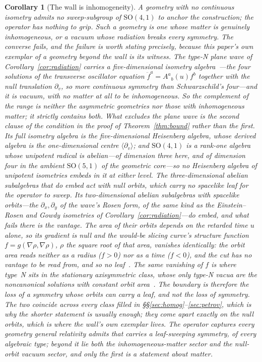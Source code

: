 \documentclass[11pt,a4paper]{article}
\newtheorem{corollary}[theorem]{Corollary}
\theoremstyle{definition}
\newcommand{\so}{\mathrm{SO}(4,1)}
\begin{document}
\begin{corollary}[The wall is inhomogeneity]\label{cor:wall}
A geometry with no continuous isometry admits no sweep-subgroup of $\so$ to anchor the construction; the operator has nothing to grip. Such a geometry is one whose matter is genuinely inhomogeneous, or a vacuum whose radiation breaks every symmetry. \emph{The converse fails, and the failure is worth stating precisely, because this paper's own exemplar of a geometry beyond the wall is its witness.} The type-N plane wave of Corollary~\ref{cor:radiation} carries a \emph{five}-dimensional isometry algebra~\cite{BondiPiraniRobinson1959}---the four solutions of the transverse oscillator equation $\ddot f^{a}=A^{a}{}_{b}(u)f^{b}$ together with the null translation $\partial_v$, so more continuous symmetry than Schwarzschild's four---and it is vacuum, with no matter at all to be inhomogeneous. So the complement of the range is neither the asymmetric geometries nor those with inhomogeneous matter; it strictly contains both. What excludes the plane wave is the \emph{second} clause of the condition in the proof of Theorem~\ref{thm:bound} rather than the first. Its full isometry algebra is the five-dimensional Heisenberg algebra, whose derived algebra is the one-dimensional centre $\langle\partial_v\rangle$; and $\so$ is a rank-one algebra whose unipotent radical is \emph{abelian}---of dimension three here, and of dimension four in the ambient $\mathrm{SO}(5,1)$ of the geometric core---so no Heisenberg algebra of unipotent isometries embeds in it at either level. The three-dimensional abelian subalgebras that do embed act with \emph{null} orbits, which carry no spacelike leaf for the operator to sweep. Its two-dimensional abelian subalgebras with spacelike orbits---the $\partial_{x},\partial_{y}$ of the wave's Rosen form, of the same kind as the Einstein--Rosen and Gowdy isometries of Corollary~\ref{cor:radiation}---do embed, and what fails there is the vantage. The area of their orbits depends on the retarded time $u$ alone, so its gradient is null and the would-be slicing curve's structure function $f=g(\nabla\rho,\nabla\rho)$, $\rho$ the square root of that area, vanishes identically: the orbit area reads neither as a radius ($f>0$) nor as a time ($f<0$), and the cut has no vantage to be read from, and so no leaf~\cite{JanzenOperator}. The same vanishing of $f$ is where type~N sits in the stationary axisymmetric class, whose only type-N vacua are the noncanonical solutions with constant orbit area~\cite{Hoffman1969a,MorisettiReinaTreves1980}. \emph{The boundary is therefore the loss of a symmetry whose orbits can carry a leaf, and not the loss of symmetry.} The two coincide across every class filled in \S\S\ref{sec:homog}--\ref{sec:petrov}, which is why the shorter statement is usually enough; they come apart exactly on the null orbits, which is where the wall's own exemplar lives. The operator captures every geometry general relativity admits that carries a leaf-sweeping symmetry, of every algebraic type; beyond it lie both the inhomogeneous-matter sector and the null-orbit vacuum sector, and only the first is a statement about matter.
\end{corollary}
\end{document}
